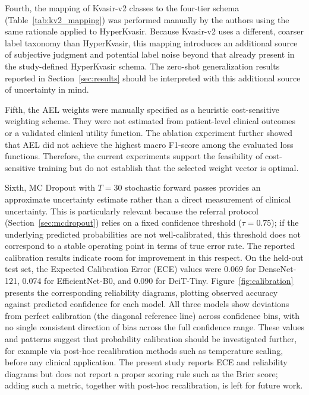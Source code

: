 \documentclass[11pt,a4paper]{article}
\begin{document}
Fourth, the mapping of Kvasir-v2 classes to the four-tier schema
(Table~\ref{tab:kv2_mapping}) was performed manually by the authors using
the same rationale applied to HyperKvasir. Because Kvasir-v2 uses a
different, coarser label taxonomy than HyperKvasir, this mapping introduces
an additional source of subjective judgment and potential label noise beyond
that already present in the study-defined HyperKvasir schema. The zero-shot
generalization results reported in Section~\ref{sec:results} should be
interpreted with this additional source of uncertainty in mind.

Fifth, the AEL weights were manually specified as a heuristic cost-sensitive
weighting scheme. They were not estimated from patient-level clinical outcomes
or a validated clinical utility function. The ablation experiment further
showed that AEL did not achieve the highest macro F1-score among the evaluated
loss functions. Therefore, the current experiments support the feasibility of
cost-sensitive training but do not establish that the selected weight vector
is optimal.

Sixth, MC Dropout with $T=30$ stochastic forward passes provides an
approximate uncertainty estimate rather than a direct measurement of clinical
uncertainty. This is particularly relevant because the referral protocol
(Section~\ref{sec:mcdropout}) relies on a fixed confidence threshold
($\tau=0.75$); if the underlying predicted probabilities are not
well-calibrated, this threshold does not correspond to a stable operating
point in terms of true error rate. The reported calibration results
indicate room for improvement in this respect. On the held-out test set,
the Expected Calibration Error (ECE) values were 0.069 for DenseNet-121,
0.074 for EfficientNet-B0, and 0.090 for DeiT-Tiny. Figure~\ref{fig:calibration}
presents the corresponding reliability diagrams, plotting observed accuracy
against predicted confidence for each model. All three models show
deviations from perfect calibration (the diagonal reference line) across
confidence bins, with no single consistent direction of bias across the
full confidence range. These values and patterns suggest that probability
calibration should be investigated further, for example via post-hoc
recalibration methods such as temperature scaling, before any clinical
application. The present study reports ECE and reliability diagrams but
does not report a proper scoring rule such as the Brier score; adding such
a metric, together with post-hoc recalibration, is left for future work.
\end{document}
